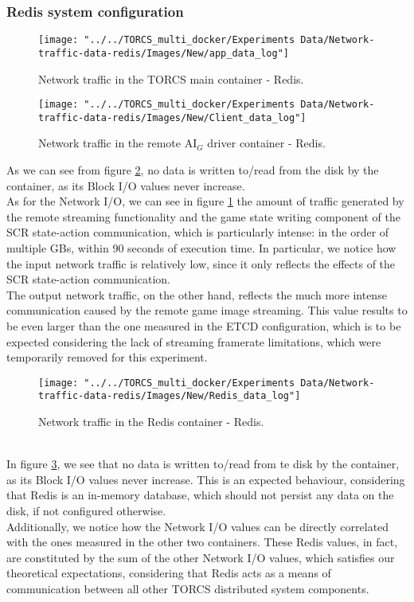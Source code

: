 \subsubsection{Redis system configuration}
\begin{figure}[h!]
	\centering
	\texttt{[image: "../../TORCS\_multi\_docker/Experiments Data/Network-traffic-data-redis/Images/New/app\_data\_log"]}
	\caption[Network traffic in the TORCS application container - Redis]{Network traffic in the TORCS main container - Redis.}
	\label{fig:appdatalogredis}
\end{figure}
\begin{figure}[h!]
	\centering
	\texttt{[image: "../../TORCS\_multi\_docker/Experiments Data/Network-traffic-data-redis/Images/New/Client\_data\_log"]}
	\caption[Network traffic in the remote AI$_G$ driver container - Redis]{Network traffic in the remote AI$_G$ driver container - Redis.}
	\label{fig:clientdatalogredis}
\end{figure}
As we can see from figure \ref{fig:clientdatalogredis}, no data is written to/read from the disk by the container, as its Block I/O values never increase. \\
As for the Network I/O, we can see in figure \ref{fig:appdatalogredis} the amount of traffic generated by the remote streaming functionality and the game state writing component of the SCR state-action communication, which is particularly intense: in the order of multiple GBs, within 90 seconds of execution time. In particular, we notice how the input network traffic is relatively low, since it only reflects the effects of the SCR state-action communication. \\ 
The output network traffic, on the other hand, reflects the much more intense communication caused by the remote game image streaming. This value results to be even larger than the one measured in the ETCD configuration, which is to be expected considering the lack of streaming framerate limitations, which were temporarily removed for this experiment.
\begin{figure}[h!]
	\centering
	\texttt{[image: "../../TORCS\_multi\_docker/Experiments Data/Network-traffic-data-redis/Images/New/Redis\_data\_log"]}
	\caption[Network traffic in the Redis container - Redis]{Network traffic in the Redis container - Redis.}
	\label{fig:redisdatalog}
\end{figure}
\\ In figure \ref{fig:redisdatalog}, we see that no data is written to/read from te disk by the container, as its Block I/O values never increase. This is an expected behaviour, considering that Redis is an in-memory database, which should not persist any data on the disk, if not configured otherwise. \\
Additionally, we notice how the Network I/O values can be directly correlated with the ones measured in the other two containers. These Redis values, in fact, are constituted by the sum of the other Network I/O values, which satisfies our theoretical expectations, considering that Redis acts as a means of communication between all other TORCS distributed system components.

